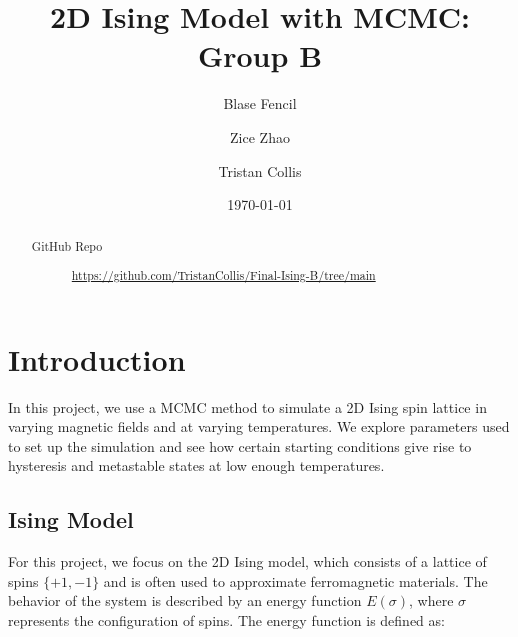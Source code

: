 \documentclass[%
 reprint,
 amsmath,amssymb,
 aps,
]{revtex4-2}
\begin{document}

\title{2D Ising Model with MCMC:\\Group B}%

\author{Blase Fencil}
\author{Zice Zhao}%
\author{Tristan Collis}

\date{\today}%

\begin{abstract}
\begin{description}
\item[GitHub Repo]
\href{https://github.com/TristanCollis/Final-Ising-B/tree/main}{https://github.com/TristanCollis/Final-Ising-B/tree/main}
\end{description}
\end{abstract}

\maketitle


\section{\label{sec:level1}Introduction}

In this project, we use a MCMC method to simulate a 2D Ising spin lattice in varying magnetic fields and at varying temperatures. We explore parameters used to set up the simulation and see how certain starting conditions give rise to hysteresis and metastable states at low enough temperatures.

\subsection{\label{sec:level2}Ising Model}

For this project, we focus on the 2D Ising model, which consists of a lattice of spins $\{+1, -1\}$ and is often used to approximate ferromagnetic materials. The behavior of the system is described by an energy function $E(\sigma)$, where $\sigma$ represents the configuration of spins. The energy function is defined as:
\end{document}
